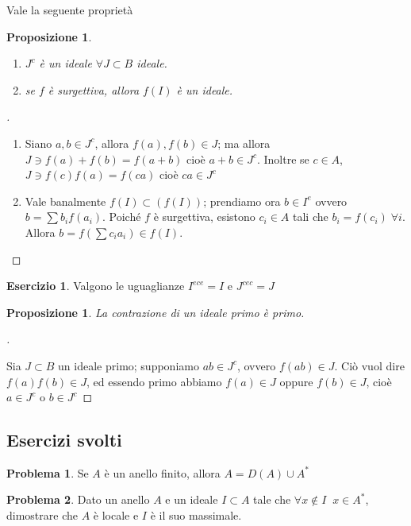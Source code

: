\documentclass[a4paper,10pt]{article}
\theoremstyle{plain}
\newtheorem{prop}[thm]{Proposizione}
\theoremstyle{definition}
\newtheorem{prob}{Problema}[section]
\newtheorem{es}{Esercizio}[section]
\newenvironment{myproof}[1][\proofname]{%
  \begin{proof}[#1]$ $\par\nobreak\ignorespaces
}{%
  \qedhere
  \end{proof}
}
\begin{document}
Vale la seguente proprietà
\begin{prop}
    $ $
    \begin{enumerate}
        \item $J^c$ è un ideale $\forall J\subset B$ ideale.
        \item se $f$ è surgettiva, allora $f(I)$ è un ideale.
    \end{enumerate}
\end{prop}
\begin{myproof}
    \begin{enumerate}
        \item Siano $a,b\in J^c$, allora $f(a),f(b)\in J$; ma allora $J\ni f(a)+f(b)=f(a+b)$ cioè $a+b\in J^c$. Inoltre se $c\in A$, $J\ni f(c)f(a)=f(ca)$ cioè $ca\in J^c$
        \item Vale banalmente $f(I)\subset (f(I))$; prendiamo ora $b\in I^e$ ovvero $b=\sum b_if(a_i)$. Poiché $f$ è surgettiva, esistono $c_i\in A$ tali che $b_i=f(c_i)\;\forall i$. Allora $b=f\left( \sum c_ia_i \right)\in f(I)$.
    \end{enumerate}
\end{myproof}

\begin{es}
    Valgono le uguaglianze $I^{ece}=I$ e $J^{cec}=J$
\end{es}

\begin{prop}
    La contrazione di un ideale primo è primo.
\end{prop}
\begin{myproof}
    Sia $J\subset B$ un ideale primo; supponiamo $ab\in J^c$, ovvero $f(ab)\in J$. Ciò vuol dire $f(a)f(b)\in J$, ed essendo primo abbiamo $f(a)\in J$ oppure $f(b)\in J$, cioè $a\in J^c$ o $b\in J^c$
\end{myproof}

\subsection{Esercizi svolti}
\begin{prob}
    Se $A$ è un anello finito, allora $A=D(A)\cup A^\ast$
\end{prob}

\begin{prob}
    Dato un anello $A$ e un ideale $I\subset A$ tale che $\forall x\not\in I\;\;x\in A^\ast$, dimostrare che $A$ è locale e $I$ è il suo massimale.
\end{prob}
\end{document}
